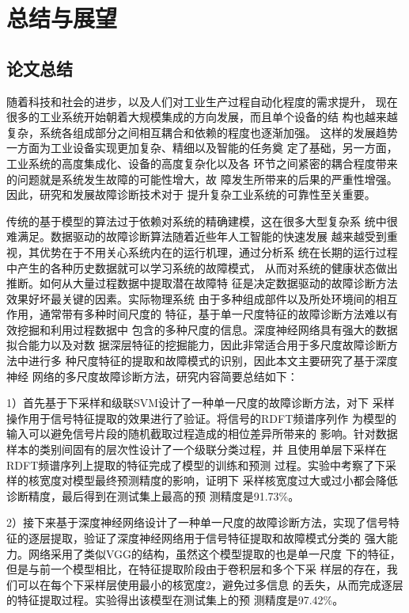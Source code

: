 \chapter{总结与展望}
\label{cha:summary}

\section{论文总结}

随着科技和社会的进步，以及人们对工业生产过程自动化程度的需求提升，
现在很多的工业系统开始朝着大规模集成的方向发展，而且单个设备的结
构也越来越复杂，系统各组成部分之间相互耦合和依赖的程度也逐渐加强。
这样的发展趋势一方面为工业设备实现更加复杂、精细以及智能的任务奠
定了基础，另一方面，工业系统的高度集成化、设备的高度复杂化以及各
环节之间紧密的耦合程度带来的问题就是系统发生故障的可能性增大，故
障发生所带来的后果的严重性增强。因此，研究和发展故障诊断技术对于
提升复杂工业系统的可靠性至关重要。

传统的基于模型的算法过于依赖对系统的精确建模，这在很多大型复杂系
统中很难满足。数据驱动的故障诊断算法随着近些年人工智能的快速发展
越来越受到重视，其优势在于不用关心系统内在的运行机理，通过分析系
统在长期的运行过程中产生的各种历史数据就可以学习系统的故障模式，
从而对系统的健康状态做出推断。如何从大量过程数据中提取潜在故障特
征是决定数据驱动的故障诊断方法效果好坏最关键的因素。实际物理系统
由于多种组成部件以及所处环境间的相互作用，通常带有多种时间尺度的
特征，基于单一尺度特征的故障诊断方法难以有效挖掘和利用过程数据中
包含的多种尺度的信息。深度神经网络具有强大的数据拟合能力以及对数
据深层特征的挖掘能力，因此非常适合用于多尺度故障诊断方法中进行多
种尺度特征的提取和故障模式的识别，因此本文主要研究了基于深度神经
网络的多尺度故障诊断方法，研究内容简要总结如下：

1）首先基于下采样和级联SVM设计了一种单一尺度的故障诊断方法，对下
采样操作用于信号特征提取的效果进行了验证。将信号的RDFT频谱序列作
为模型的输入可以避免信号片段的随机截取过程造成的相位差异所带来的
影响。针对数据样本的类别间固有的层次性设计了一个级联分类过程，并
且使用单层下采样在RDFT频谱序列上提取的特征完成了模型的训练和预测
过程。实验中考察了下采样的核宽度对模型最终预测精度的影响，证明下
采样核宽度过大或过小都会降低诊断精度，最后得到在测试集上最高的预
测精度是91.73\%。

2）接下来基于深度神经网络设计了一种单一尺度的故障诊断方法，实现了信号特
征的逐层提取，验证了深度神经网络用于信号特征提取和故障模式分类的
强大能力。网络采用了类似VGG的结构，虽然这个模型提取的也是单一尺度
下的特征，但是与前一个模型相比，在特征提取阶段由于卷积层和多个下采
样层的存在，我们可以在每个下采样层使用最小的核宽度2，避免过多信息
的丢失，从而完成逐层的特征提取过程。实验得出该模型在测试集上的预
测精度是97.42\%。

